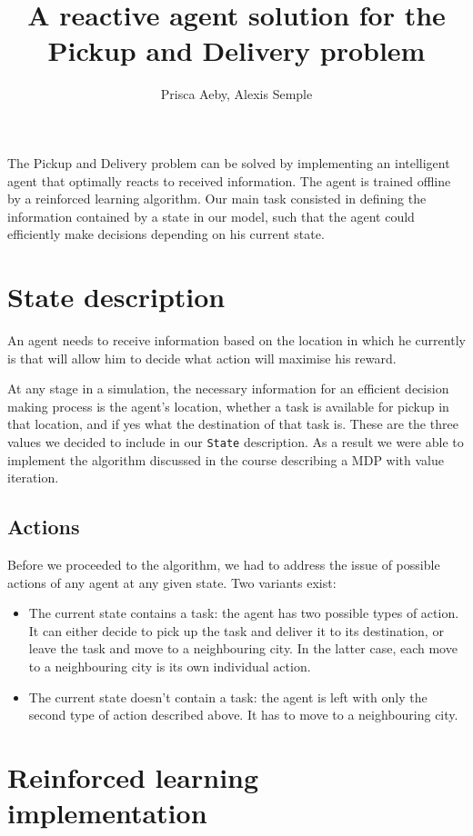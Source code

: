 \documentclass[12pt,a4paper]{article}
\author{Prisca Aeby, Alexis Semple}
\title{A reactive agent solution for the Pickup and Delivery problem}
\date{}
\begin{document}
\maketitle

The Pickup and Delivery problem can be solved by implementing an intelligent agent that optimally reacts to received information. The agent is trained offline by a reinforced learning algorithm. Our main task consisted in defining the information contained by a state in our model, such that the agent could efficiently make decisions depending on his current state.

\section{State description}
An agent needs to receive information based on the location in which he currently is that will allow him to decide what action will maximise his reward.

At any stage in a simulation, the necessary information for an efficient decision making process is the agent's location, whether a task is available for pickup in that location, and if yes what the destination of that task is. These are the three values we decided to include in our \texttt{State} description. As a result we were able to implement the algorithm discussed in the course describing a MDP with value iteration. 

\subsection*{Actions}

Before we proceeded to the algorithm, we had to address the issue of possible actions of any agent at any given state. Two variants exist:

\begin{itemize}
\item The current state contains a task: the agent has two possible types of action. It can either decide to pick up the task and deliver it to its destination, or leave the task and move to a neighbouring city. In the latter case, each move to a neighbouring city is its own individual action.
\item The current state doesn't contain a task: the agent is left with only the second type of action described above. It has to move to a neighbouring city.
\end{itemize}

\section{Reinforced learning implementation}
\end{document}
